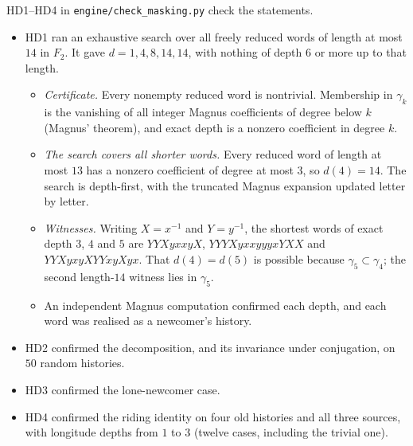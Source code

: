 \documentclass[11pt]{article}
\theoremstyle{definition}\newtheorem{definition}[theorem]{Definition}\newtheorem{remark}[theorem]{Remark}\newtheorem{example}[theorem]{Example}\newtheorem{problem}[theorem]{Open problem}\crefname{problem}{Problem}{Problems}
\begin{document}
HD1--HD4 in \texttt{engine/check\_masking.py} check the statements.
\begin{itemize}
\item HD1 ran an exhaustive search over all freely reduced words of length at most $14$ in $F_2$. It gave $d=1,4,8,14,14$, with nothing of depth $6$ or more up to that length.
\begin{itemize}
\item \emph{Certificate.} Every nonempty reduced word is nontrivial. Membership in $\gamma_k$ is the vanishing of all integer Magnus coefficients of degree below $k$ (Magnus' theorem), and exact depth is a nonzero coefficient in degree $k$.
\item \emph{The search covers all shorter words.} Every reduced word of length at most $13$ has a nonzero coefficient of degree at most $3$, so $d(4)=14$. The search is depth-first, with the truncated Magnus expansion updated letter by letter.
\item \emph{Witnesses.} Writing $X=x^{-1}$ and $Y=y^{-1}$, the shortest words of exact depth $3$, $4$ and $5$ are $YYXyxxyX$, $YYYXyxxyyyxYXX$ and $YYXyxyXYYxyXyx$. That $d(4)=d(5)$ is possible because $\gamma_5\subset\gamma_4$; the second length-$14$ witness lies in $\gamma_5$.
\item An independent Magnus computation confirmed each depth, and each word was realised as a newcomer's history.
\end{itemize}
\item HD2 confirmed the decomposition, and its invariance under conjugation, on $50$ random histories.
\item HD3 confirmed the lone-newcomer case.
\item HD4 confirmed the riding identity on four old histories and all three sources, with longitude depths from $1$ to $3$ (twelve cases, including the trivial one).
\end{itemize}
\end{document}
